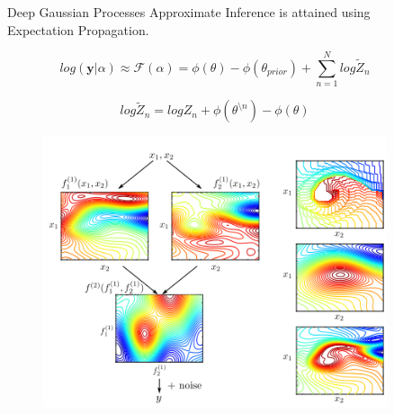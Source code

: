 \documentclass[final]{beamer}
\newlength{\sepwid}
\newlength{\onecolwid}
\newlength{\twocolwid}
\begin{document}
\begin{frame}[t]
\begin{columns}[t]
\begin{column}{\onecolwid}
\begin{block}{Deep Gaussian Processes}
Approximate Inference is attained using Expectation Propagation.

$$log(\boldsymbol y|\alpha)\approx \mathcal{F}(\alpha)=\phi(\theta)-\phi(\theta_{prior}) + \sum_{n=1}^N log \tilde{Z}_n$$

$$log \tilde{Z}_n = log Z_n + \phi(\theta^{\setminus n}) - \phi(\theta)$$

\end{block}
\begin{figure}
\includegraphics[width=\linewidth]{dgp.PNG}
\end{figure}


\end{column} %

\begin{column}{\sepwid}\end{column} %

\begin{column}{\twocolwid} %

\begin{columns}[t,totalwidth=\twocolwid] %

\begin{column}{\onecolwid}\vspace{-.6in} %



\end{column}
\end{columns}
\end{column}
\end{columns}
\end{frame}
\end{document}
